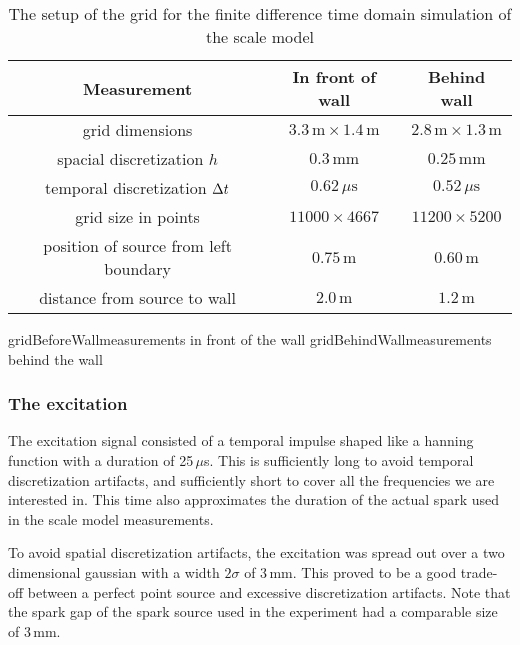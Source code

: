 \begin{table}[htb]
\begin{center}
\caption{The setup of the grid for the finite difference time domain simulation of the scale model\label{gridSetup}}
\begin{tabular}{c|c|c}
Measurement&	In front of wall&	Behind wall\\\hline
grid dimensions&
	$3.3\,\mathrm{m} \times 1.4\,\mathrm{m}$&
	$2.8\,\mathrm{m} \times 1.3\,\mathrm{m}$\\
spacial discretization $h$&
	$0.3\,\mathrm{mm}$&
	$0.25\,\mathrm{mm}$\\
temporal discretization $\Delta t$&
	$0.62\,\mu\mathrm{s}$&
	$0.52\,\mu\mathrm{s}$\\
grid size in points&
	$11000 \times 4667$&
	$11200 \times 5200$\\
position of source from left boundary&
	$0.75\,\mathrm{m}$&
	$0.60\,\mathrm{m}$\\
distance from source to wall&
	$2.0\,\mathrm{m}$&
	$1.2\,\mathrm{m}$\\
\end{tabular}
\end{center}
\end{table}


	{gridBeforeWall}{measurements in front of the wall}
	{gridBehindWall}{measurements behind the wall}




\subsubsection*{The excitation}
The excitation signal consisted of a temporal impulse shaped like a hanning function with a duration of 25\,$\mu$s. This is sufficiently long to avoid temporal discretization artifacts, and sufficiently short to cover all the frequencies we are interested in. This time also approximates the duration of the actual spark used in the scale model measurements.

To avoid spatial discretization artifacts, the excitation was spread out over a two dimensional gaussian with a width $2\sigma$ of 3\,mm. This proved to be a good trade-off between a perfect point source and excessive discretization artifacts. Note that the spark gap of the spark source used in the experiment had a comparable size of 3\,mm.

